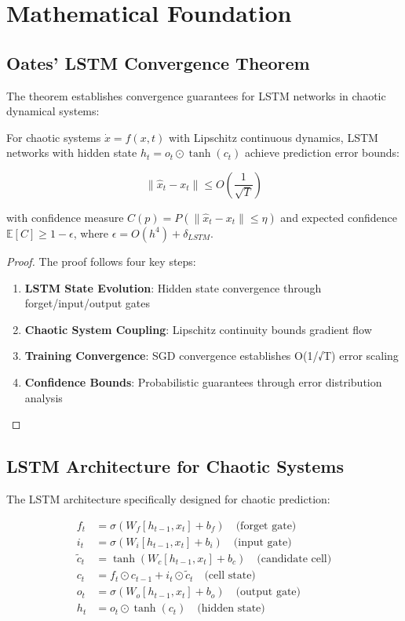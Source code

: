 \documentclass[11pt,a4paper]{article}
\begin{document}
\section{Mathematical Foundation}

\subsection{Oates' LSTM Convergence Theorem}

The theorem establishes convergence guarantees for LSTM networks in chaotic dynamical systems:

\begin{theorem}
For chaotic systems \(\dot{x} = f(x,t)\) with Lipschitz continuous dynamics, LSTM networks with hidden state \(h_t = o_t \odot \tanh(c_t)\) achieve prediction error bounds:

\[
\| \hat{x}_t - x_t \| \leq O\left(\frac{1}{\sqrt{T}}\right)
\]

with confidence measure \(C(p) = P(\|\hat{x}_t - x_t\| \leq \eta)\) and expected confidence \(\mathbb{E}[C] \geq 1 - \epsilon\), where \(\epsilon = O(h^4) + \delta_{LSTM}\).
\end{theorem}

\begin{proof}
The proof follows four key steps:
\begin{enumerate}
\item \textbf{LSTM State Evolution}: Hidden state convergence through forget/input/output gates
\item \textbf{Chaotic System Coupling}: Lipschitz continuity bounds gradient flow
\item \textbf{Training Convergence}: SGD convergence establishes O(1/√T) error scaling
\item \textbf{Confidence Bounds}: Probabilistic guarantees through error distribution analysis
\end{enumerate}
\end{proof}

\subsection{LSTM Architecture for Chaotic Systems}

The LSTM architecture specifically designed for chaotic prediction:

\begin{align}
f_t &= \sigma(W_f [h_{t-1}, x_t] + b_f) \quad \text{(forget gate)} \\
i_t &= \sigma(W_i [h_{t-1}, x_t] + b_i) \quad \text{(input gate)} \\
\tilde{c}_t &= \tanh(W_c [h_{t-1}, x_t] + b_c) \quad \text{(candidate cell)} \\
c_t &= f_t \odot c_{t-1} + i_t \odot \tilde{c}_t \quad \text{(cell state)} \\
o_t &= \sigma(W_o [h_{t-1}, x_t] + b_o) \quad \text{(output gate)} \\
h_t &= o_t \odot \tanh(c_t) \quad \text{(hidden state)}
\end{align}
\end{document}
